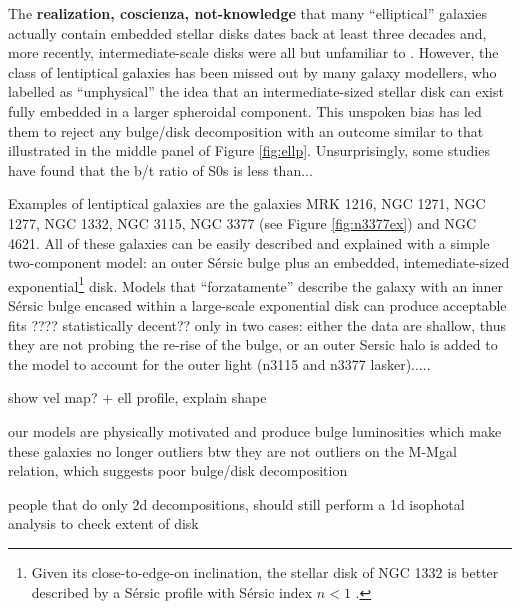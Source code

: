 \documentclass[preprint2]{emulateapj}
\begin{document}
The {\bf realization, coscienza, not-knowledge} that many ``elliptical'' galaxies 
actually contain embedded stellar disks 
dates back at least three decades 
\citep{capaccioli1987,carter1987,rixwhite1990,bender1990,scorzabender1990,nieto1991,rixwhite1992,scorzabender1995,
donofrio1995,graham1998fornax,scorza1998,scorzavandenbosch1998,bendersaglia1999} and, 
more recently, intermediate-scale disks were all but unfamiliar to \cite{krajnovic2013}. 
However, the class of lentiptical galaxies has been missed out by many galaxy modellers, 
who labelled as ``unphysical'' the idea that an intermediate-sized stellar disk 
can exist fully embedded in a larger spheroidal component. 
This unspoken bias has led them to reject any bulge/disk decomposition with an outcome 
similar to that illustrated in the middle panel of Figure \ref{fig:ellp}. 
Unsurprisingly, some studies have found that the b/t ratio of S0s is less than...

Examples of lentiptical galaxies are the galaxies MRK 1216, NGC 1271, NGC 1277, NGC 1332, NGC 3115, NGC 3377 
(see Figure \ref{fig:n3377ex}) and NGC 4621. 
All of these galaxies can be easily described and explained with a simple two-component model: 
an outer S\'ersic bulge plus an embedded, intemediate-sized exponential\footnote{Given 
its close-to-edge-on inclination,  
the stellar disk of NGC 1332 is better described by a S\'ersic profile with S\'ersic index $n<1$ 
\citep{pastrav2013a,pastrav2013b}.} disk. 
Models that ``forzatamente'' describe the galaxy with an inner S\'ersic bulge 
encased within a large-scale exponential disk can produce acceptable fits ???? statistically decent??
only in two cases:
either the data are shallow, thus they are not probing the re-rise of the bulge, 
or an outer Sersic halo is added to the model to account for the outer light (n3115 and n3377 lasker).....





show vel map? + ell profile, explain shape


our models are physically motivated and produce bulge luminosities which make these galaxies no longer outliers
btw they are not outliers on the M-Mgal relation, which suggests poor bulge/disk decomposition



people that do only 2d decompositions, should still perform a 1d isophotal analysis to check extent of disk


 
\end{document}
